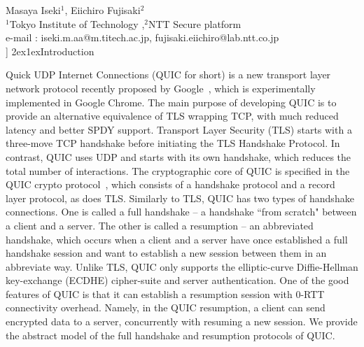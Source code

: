\documentclass[11pt,a4j]{jarticle}
\makeatletter
\renewcommand{\baselinestretch}{1.3}\selectfont
\def\Title#1{{\Large\bf#1}\\[6pt]}
\def\Author#1{{\normalsize\hspace*{2zw}#1}\\[-4pt]}
\def\Affiliation#1{{\normalsize\hspace*{2zw}#1}\\[-5pt]}
\def\Email#1{\hspace*{2zw}e-mail : #1\\[0pt]}
\renewcommand{\section}{\@startsection{section}{1}{\z@}%
{2ex}{1ex}{\reset@font\large\bfseries}}%
\makeatother
\begin{document}
\twocolumn[
%
\Title{On the security of QUIC}
\Author{Masaya Iseki$^{1}$, Eiichiro Fujisaki$^{2}$}
\Affiliation{$^{1}$Tokyo Institute of Technology ,$^{2}$NTT Secure platform}
\Email{iseki.m.aa@m.titech.ac.jp, fujisaki.eiichiro@lab.ntt.co.jp}
%
]
\renewcommand{\baselinestretch}{0.95}\selectfont
%
%
\section{Introduction}

Quick UDP Internet Connections (QUIC for short)
is a new transport layer network protocol recently proposed by Google~\cite{QUIC},
which is experimentally implemented in Google Chrome.
The main purpose of developing QUIC is to provide an alternative equivalence of TLS wrapping TCP,
with much reduced latency and better SPDY support.
Transport Layer Security (TLS) starts with a three-move TCP handshake
before initiating the TLS Handshake Protocol.
In contrast, QUIC uses UDP and starts with its own handshake,
which reduces the total number of interactions.
The cryptographic core of QUIC is specified in the QUIC crypto protocol~\cite{QUIC:Crypto},
which consists of a handshake protocol and a record layer protocol,
as does TLS.
Similarly to TLS, QUIC has two types of handshake connections.
One is called a full handshake --
a handshake ``from scratch" between a client and a server.
The other is called a resumption -- an abbreviated handshake,
which occurs when a client and a server have once established a full handshake session
and want to establish a new session between them in an abbreviate way.
Unlike TLS,
QUIC only supports the elliptic-curve Diffie-Hellman key-exchange (ECDHE) cipher-suite and server authentication.
%
One of the good features of QUIC is that it can establish a resumption session
with $0$-RTT connectivity overhead.
Namely, in the QUIC resumption, a client can
send encrypted data to a server, concurrently with resuming a new session.
We provide the abstract model of the full handshake and resumption protocols of QUIC.
\end{document}
